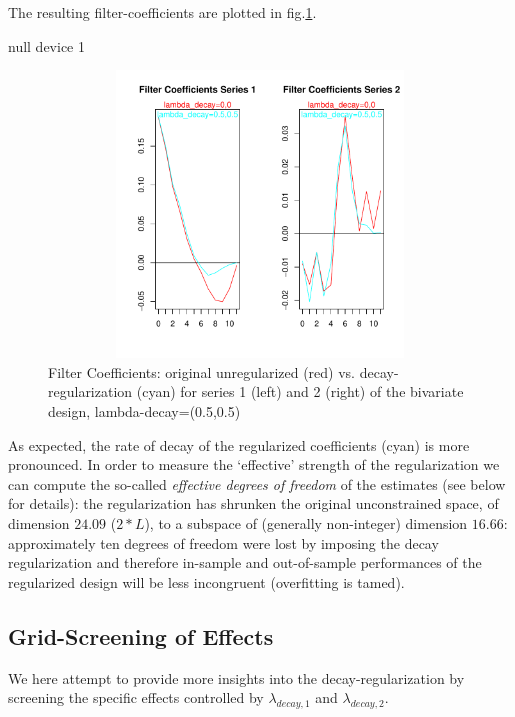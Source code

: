 \documentclass[a4paper]{book}
\begin{document}
The resulting filter-coefficients are plotted in fig.\ref{z_mdfa_ms_reg_decay}.
\begin{Schunk}
\begin{Soutput}
null device 
          1 
\end{Soutput}
\end{Schunk}
\begin{figure}[H]\begin{center}\includegraphics[height=3in, width=6in]{z_mdfa_ms_reg_decay}\caption{Filter Coefficients: original unregularized (red) vs. decay-regularization (cyan) for series 1 (left) and 2 (right) of the bivariate design, lambda-decay=(0.5,0.5)\label{z_mdfa_ms_reg_decay}}\end{center}\end{figure}As expected, the rate of decay of the regularized coefficients (cyan) is more pronounced. In order to measure the `effective' strength of the regularization we can compute the so-called \emph{effective degrees of freedom} of the estimates (see below for details): the regularization has shrunken the original unconstrained space, of dimension $24.09$ ($2*L$), to a subspace of (generally non-integer) dimension $16.66$: approximately ten degrees of freedom were lost by imposing the decay regularization and therefore in-sample and out-of-sample performances of the regularized design will be less incongruent (overfitting is tamed).



\subsection{Grid-Screening of Effects}

We here attempt to provide more insights into the decay-regularization by screening the specific effects controlled by $\lambda_{decay,1}$ and $\lambda_{decay,2}$.
\end{document}
